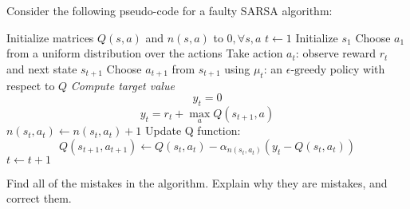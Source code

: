 \documentclass[12pt]{exam}
\newif\ifanswers
\begin{document}
\begin{question}{30}
  Consider the following pseudo-code for a faulty SARSA algorithm:
    \begin{algorithmic}
      \Procedure{SARSA}{
        number of episodes $N\in\mathbb{N}$\newline
        \phantom{\textbf{procedure} SARSA (}
        discount factor $\lambda\in(0,1]$\newline
      \phantom{\textbf{procedure} SARSA (}
      learning rate $\alpha_n=\frac{1}{\log(n+1)}$
      }
        \State Initialize matrices $Q(s,a)$ and $n(s,a)$ to $0, \forall s,a$
        \State $t\gets 1$
        \State Initialize $s_1$ 
        \State Choose $a_1$ from a uniform distribution over the actions
        \State Take action $a_t$: observe reward $r_t$ and next state $s_{t+1}$
        \State Choose $a_{t+1}$ from $s_{t+1}$ using $\mu_t$: an $\epsilon\textrm{-greedy}$ policy with respect to $Q$
         \Comment\emph{Compute target value}
        \State $$y_t=0$$
        \Else
        \State $$y_t=r_t + \max_a Q(s_{t+1},a)$$
        \EndIf
        \State $n(s_t,a_t) \gets n(s_t,a_t) + 1$
        \State Update Q function:
        $$
        Q(s_{t+1},a_{t+1})\gets Q(s_t,a_t) - \alpha_{n(s_t,a_t)}\left(y_t - Q(s_t,a_t)\right)
        $$
        \State $t\gets t + 1$
        \EndWhile
        \EndFor
        \EndProcedure
    \end{algorithmic}
  Find all of the mistakes in the algorithm. Explain why they are mistakes, and correct them.
  \begin{minipage}[t][5in]{\linewidth}
    \ifanswers
    Put answer here
    \fi
  \end{minipage}
\end{question}
\end{document}
